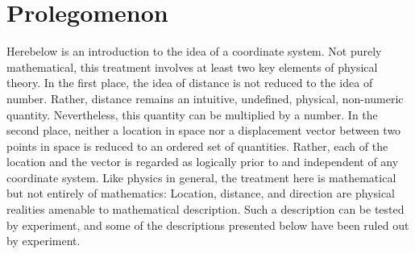 \cleardoublepage
\chapter*{Prolegomenon}

Herebelow is an introduction to the idea of a coordinate system.  Not purely
mathematical, this treatment involves at least two key elements of physical
theory.  In the first place, the idea of distance is not reduced to the idea of
number.  Rather, distance remains an intuitive, undefined, physical,
non-numeric quantity.  Nevertheless, this quantity can be multiplied by a
number.  In the second place, neither a location in space nor a displacement
vector between two points in space is reduced to an ordered set of quantities.
Rather, each of the location and the vector is regarded as logically prior to
and independent of any coordinate system.  Like physics in general, the
treatment here is mathematical but not entirely of mathematics: Location,
distance, and direction are physical realities amenable to mathematical
description. Such a description can be tested by experiment, and some of the
descriptions presented below have been ruled out by experiment.

